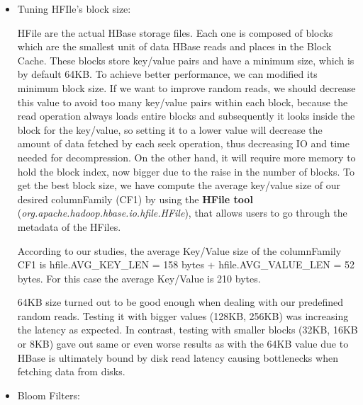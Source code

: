 \begin{itemize}
\item Tuning HFIle's block size:
\par
HFile are the actual HBase storage files. Each one is composed of blocks which are the smallest unit of data HBase reads and places in the Block Cache. These blocks store key/value pairs and have a minimum size, which is by default 64KB. To achieve better performance, we can modified its minimum block size. If we want to improve random reads, we should decrease this value to avoid too many key/value pairs within each block, because the read operation always loads entire blocks and subsequently it looks inside the block for the key/value, so setting it to a lower value will decrease the amount of data fetched by each seek operation, thus decreasing IO and time needed for decompression. On the other hand, it will require more memory to hold the block index, now bigger due to the raise in the number of blocks.
\bigskip
To get the best block size, we have compute the average key/value size of our desired columnFamily (CF1) by using the \textbf{HFile tool} (\textit{org.apache.hadoop.hbase.io.hfile.HFile}), that allows users to go through the metadata of the HFiles. 
\par
According to our studies, the average Key/Value size of the columnFamily CF1 is hfile.AVG\_KEY\_LEN = 158 bytes + hfile.AVG\_VALUE\_LEN = 52 bytes. For this case the average Key/Value is 210 bytes.
\par
64KB size turned out to be good enough when dealing with our predefined random reads. Testing it with bigger values (128KB, 256KB) was increasing the latency as expected. In contrast, testing with smaller blocks (32KB, 16KB or 8KB) gave out same or even worse results as with the 64KB value due to HBase is ultimately bound by disk read latency causing bottlenecks when fetching data from disks.


\item Bloom Filters:


\end{itemize}
